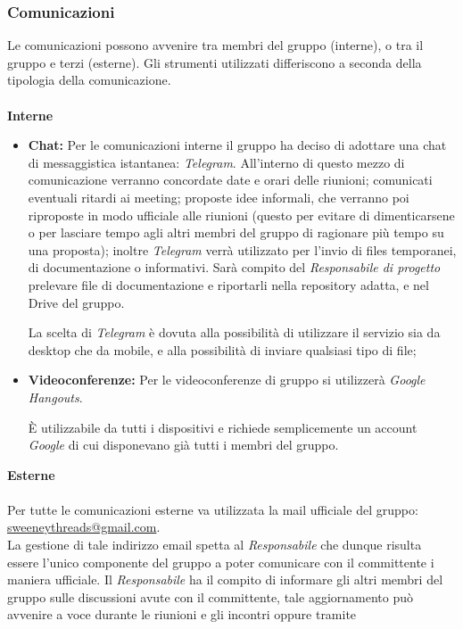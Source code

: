 \documentclass[a4paper]{article}
\begin{document}
	\subsubsection{Comunicazioni}
	Le comunicazioni possono avvenire tra membri del gruppo (interne), o tra il gruppo e terzi (esterne). Gli
	strumenti utilizzati differiscono a seconda della tipologia della comunicazione.
	\\ \\
	\textbf{Interne}
	\begin{itemize}
		\item \textbf{Chat:} Per le comunicazioni interne il gruppo ha deciso di adottare una chat di messaggistica
		istantanea: \emph{Telegram}. All'interno di questo mezzo di comunicazione verranno concordate date e orari
		delle riunioni; comunicati eventuali ritardi ai meeting; proposte idee informali, che verranno poi riproposte
		in modo ufficiale alle riunioni (questo per evitare di dimenticarsene o per lasciare tempo agli altri membri
		del gruppo di ragionare più tempo su una proposta); inoltre \emph{Telegram} verrà utilizzato per l'invio di files
		temporanei, di documentazione o informativi. Sarà compito del \emph{Responsabile di progetto} prelevare file di documentazione
		e riportarli nella repository adatta, e nel Drive del gruppo.

		La scelta di \emph{Telegram} è dovuta alla possibilità di utilizzare il servizio sia da desktop che da mobile, e alla
		possibilità di inviare qualsiasi tipo di file;
		\item \textbf{Videoconferenze:} Per le videoconferenze di gruppo si utilizzerà \emph{Google Hangouts}.

		È utilizzabile da tutti i dispositivi e richiede semplicemente un account \emph{Google} di cui disponevano
		già tutti i membri del gruppo.
	\end{itemize}
	\textbf{Esterne}
	\\ \\
	Per tutte le comunicazioni esterne va utilizzata la mail ufficiale del gruppo: \href{mailto:sweeneythreads@gmail.com}{sweeneythreads@gmail.com}.
	 \\ La gestione di tale indirizzo email spetta al \emph{Responsabile} che dunque risulta essere l'unico componente del gruppo a poter comunicare
	con il committente i maniera ufficiale. Il \emph{Responsabile} ha il compito di informare gli altri membri del gruppo sulle
	discussioni avute con il committente, tale aggiornamento può avvenire a voce durante le riunioni e gli incontri oppure tramite
\end{document}
